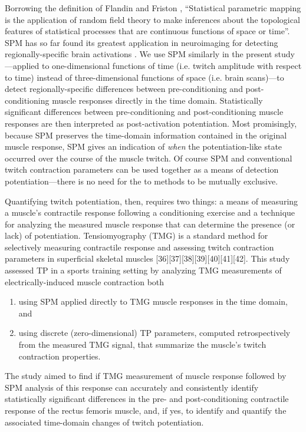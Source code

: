 \documentclass[utf8]{FrontiersinHarvard}
\begin{document}
Borrowing the definition of Flandin and Friston \cite{flandin}, 
``Statistical parametric mapping is the application of random field theory to make inferences about the topological features of statistical processes that are continuous functions of space or time''.
SPM has so far found its greatest application in neuroimaging for detecting regionally-specific brain activations \cite{friston}.
We use SPM similarly in the present study---applied to one-dimensional functions of time (i.e. twitch amplitude with respect to time) instead of three-dimensional functions of space (i.e. brain scans)---to detect regionally-specific differences between pre-conditioning and post-conditioning muscle responses directly in the time domain.
Statistically significant differences between pre-conditioning and post-conditioning muscle responses are then interpreted as post-activation potentiation.
Most promisingly, because SPM preserves the time-domain information contained in the original muscle response, SPM gives an indication of \textit{when} the potentiation-like state occurred over the course of the muscle twitch.
Of course SPM and conventional twitch contraction parameters can be used together as a means of detection potentiation---there is no need for the to methods to be mutually exclusive.

Quantifying twitch potentiation, then, requires two things: a means of measuring a muscle's contractile response following a conditioning exercise and a technique for analyzing the measured muscle response that can determine the presence (or lack) of potentiation.
Tensiomyography (TMG) is a standard method for selectively measuring contractile response and assessing twitch contraction parameters in superficial skeletal muscles [36][37][38][39][40][41][42].
This study assessed TP in a sports training setting by analyzing TMG measurements of electrically-induced muscle contraction both
\begin{enumerate}

    \item using SPM applied directly to TMG muscle responses in the time domain, and

    \item using discrete (zero-dimensional) TP parameters, computed retrospectively from the measured TMG signal, that summarize the muscle's twitch contraction properties.

\end{enumerate}
The study aimed to find if TMG measurement of muscle response followed by SPM analysis of this response can accurately and consistently identify statistically significant differences in the pre- and post-conditioning contractile response of the rectus femoris muscle, and,
if yes, to identify and quantify the associated time-domain changes of twitch potentiation.
\end{document}
